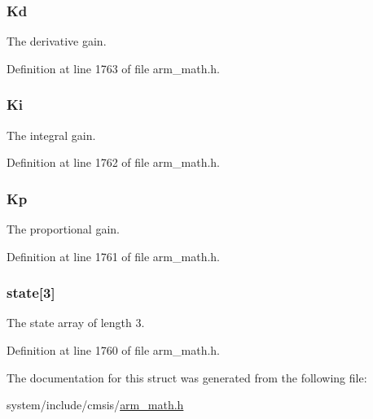 \subsubsection[{\texorpdfstring{Kd}{Kd}}]{ Kd}\hypertarget{structarm__pid__instance__q31_a213bbf14da7ea536998f611977173552}{}\label{structarm__pid__instance__q31_a213bbf14da7ea536998f611977173552}
The derivative gain. 

Definition at line 1763 of file arm\+\_\+math.\+h.

\subsubsection[{\texorpdfstring{Ki}{Ki}}]{ Ki}\hypertarget{structarm__pid__instance__q31_a84a6c05c16369c905193da0d5fc9a7b0}{}\label{structarm__pid__instance__q31_a84a6c05c16369c905193da0d5fc9a7b0}
The integral gain. 

Definition at line 1762 of file arm\+\_\+math.\+h.

\subsubsection[{\texorpdfstring{Kp}{Kp}}]{ Kp}\hypertarget{structarm__pid__instance__q31_a6ec4b37fe2246a7e017dd07578fe5bbd}{}\label{structarm__pid__instance__q31_a6ec4b37fe2246a7e017dd07578fe5bbd}
The proportional gain. 

Definition at line 1761 of file arm\+\_\+math.\+h.

\subsubsection[{\texorpdfstring{state}{state}}]{ state\mbox{[}3\mbox{]}}\hypertarget{structarm__pid__instance__q31_af0a2da4da9a94af652873ec7e7be4880}{}\label{structarm__pid__instance__q31_af0a2da4da9a94af652873ec7e7be4880}
The state array of length 3. 

Definition at line 1760 of file arm\+\_\+math.\+h.



The documentation for this struct was generated from the following file\+:\begin{DoxyCompactItemize}
\item 
system/include/cmsis/\hyperlink{arm__math_8h}{arm\+\_\+math.\+h}\end{DoxyCompactItemize}
